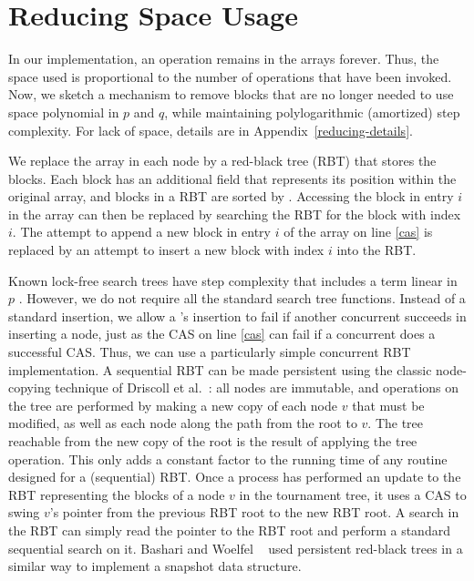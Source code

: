 
\section{Reducing Space Usage}
\label{reducing}

In our implementation, an operation remains in the  arrays forever. 
Thus, the space used is proportional to the number of operations that have been invoked.
Now, we sketch a mechanism to remove blocks that are no longer needed to use space
polynomial in $p$ and $q$, while maintaining polylogarithmic (amortized) step complexity.  For lack of space, details are in Appendix~\ref{reducing-details}.

We replace the  array in each node by a red-black tree (RBT)
that stores the blocks.
Each block has an additional  field
that represents its position within the original  array, and
blocks in a RBT are sorted by .
Accessing the block in entry $i$ in the  array can then be 
replaced by searching the RBT for the block with index $i$.
The attempt to append a new block in entry $i$ of the  array on line \ref{cas}
is replaced by an attempt to insert a new block with index $i$ into the RBT.
 
Known lock-free search trees have step complexity that includes a term linear in $p$ \cite{EFHR14,Ko20}.  
However, we do not require all the standard search tree functions.
Instead of a standard insertion, we allow a 's insertion to fail if another
concurrent  succeeds in inserting a node, just as the CAS on line \ref{cas}
can fail if a concurrent  does a successful CAS.
Thus, we can use a particularly simple concurrent RBT implementation.
A sequential RBT can be made persistent using the classic node-copying technique of 
Driscoll et al.~\cite{DSST89}:  all nodes are immutable, and operations on the 
tree are performed by making a new copy of each node $v$ that must be modified, as well
as each node along the path from the root to $v$.
The tree reachable from the new copy of the root is the result of applying the tree operation.
This only adds a constant factor to the running time of any routine designed for a (sequential) RBT.
Once a process has performed an update to the RBT representing the blocks of a node 
$v$ in the tournament tree, 
it uses a CAS to swing $v$'s pointer from the previous RBT root to the new RBT root.
A search in the RBT can simply read the pointer to the RBT root and perform a standard
sequential search on it.
Bashari and Woelfel ~\cite{DBLP:conf/podc/BashariW21} used persistent red-black trees in a similar way to implement a snapshot data structure.

